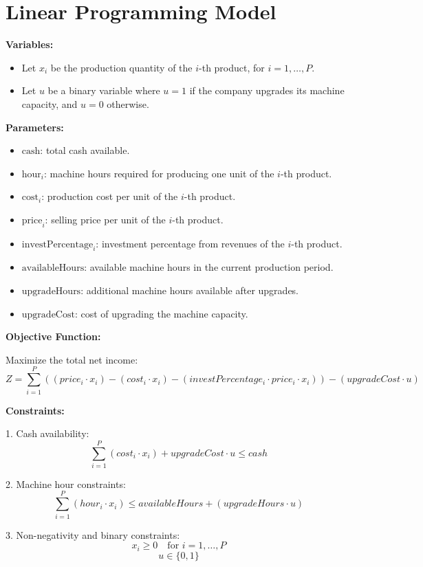 \documentclass{article}
\begin{document}
\section*{Linear Programming Model}

\textbf{Variables:}
\begin{itemize}
    \item Let \( x_i \) be the production quantity of the \( i \)-th product, for \( i = 1, \ldots, P \).
    \item Let \( u \) be a binary variable where \( u = 1 \) if the company upgrades its machine capacity, and \( u = 0 \) otherwise.
\end{itemize}

\textbf{Parameters:}
\begin{itemize}
    \item \( \text{cash} \): total cash available.
    \item \( \text{hour}_i \): machine hours required for producing one unit of the \( i \)-th product.
    \item \( \text{cost}_i \): production cost per unit of the \( i \)-th product.
    \item \( \text{price}_i \): selling price per unit of the \( i \)-th product.
    \item \( \text{investPercentage}_i \): investment percentage from revenues of the \( i \)-th product.
    \item \( \text{availableHours} \): available machine hours in the current production period.
    \item \( \text{upgradeHours} \): additional machine hours available after upgrades.
    \item \( \text{upgradeCost} \): cost of upgrading the machine capacity.
\end{itemize}

\textbf{Objective Function:}

Maximize the total net income:
\[
Z = \sum_{i=1}^P \left( (price_i \cdot x_i) - (cost_i \cdot x_i) - (investPercentage_i \cdot price_i \cdot x_i) \right) - (upgradeCost \cdot u)
\]

\textbf{Constraints:}

1. Cash availability:
\[
\sum_{i=1}^P (cost_i \cdot x_i) + upgradeCost \cdot u \leq cash
\]

2. Machine hour constraints:
\[
\sum_{i=1}^P (hour_i \cdot x_i) \leq availableHours + (upgradeHours \cdot u)
\]

3. Non-negativity and binary constraints:
\[
x_i \geq 0 \quad \text{for } i = 1, \ldots, P
\]
\[
u \in \{0, 1\}
\]
\end{document}
